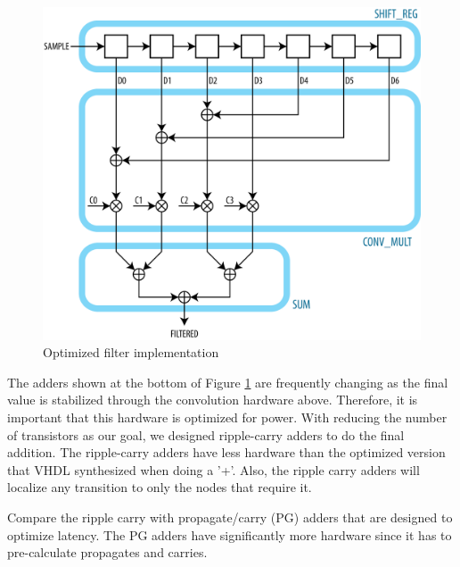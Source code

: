 \begin{figure}[ht]
\centering
\includegraphics[width=5in]{images/filter_filtered}
\caption{Optimized filter implementation}
\label{fig:optimizedfilter}
\end{figure}

The adders shown at the bottom of Figure \ref{fig:optimizedfilter} are frequently changing as the final value is stabilized through the convolution hardware above.  Therefore, it is important that this hardware is optimized for power.  With reducing the number of transistors as our goal, we designed ripple-carry adders to do the final addition.  The ripple-carry adders have less hardware than the optimized version that VHDL synthesized when doing a '+'.  Also, the ripple carry adders will localize any transition to only the nodes that require it.

Compare the ripple carry with propagate/carry (PG) adders that are designed to optimize latency.  The PG adders have significantly more hardware since it has to pre-calculate propagates and carries.  



